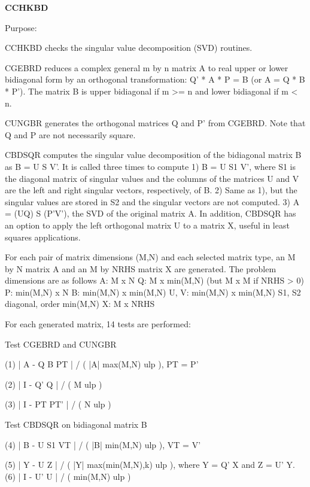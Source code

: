 {\bfseries C\+C\+H\+K\+B\+D} 

\begin{DoxyParagraph}{Purpose\+: }
\begin{DoxyVerb} CCHKBD checks the singular value decomposition (SVD) routines.

 CGEBRD reduces a complex general m by n matrix A to real upper or
 lower bidiagonal form by an orthogonal transformation: Q' * A * P = B
 (or A = Q * B * P').  The matrix B is upper bidiagonal if m >= n
 and lower bidiagonal if m < n.

 CUNGBR generates the orthogonal matrices Q and P' from CGEBRD.
 Note that Q and P are not necessarily square.

 CBDSQR computes the singular value decomposition of the bidiagonal
 matrix B as B = U S V'.  It is called three times to compute
    1)  B = U S1 V', where S1 is the diagonal matrix of singular
        values and the columns of the matrices U and V are the left
        and right singular vectors, respectively, of B.
    2)  Same as 1), but the singular values are stored in S2 and the
        singular vectors are not computed.
    3)  A = (UQ) S (P'V'), the SVD of the original matrix A.
 In addition, CBDSQR has an option to apply the left orthogonal matrix
 U to a matrix X, useful in least squares applications.

 For each pair of matrix dimensions (M,N) and each selected matrix
 type, an M by N matrix A and an M by NRHS matrix X are generated.
 The problem dimensions are as follows
    A:          M x N
    Q:          M x min(M,N) (but M x M if NRHS > 0)
    P:          min(M,N) x N
    B:          min(M,N) x min(M,N)
    U, V:       min(M,N) x min(M,N)
    S1, S2      diagonal, order min(M,N)
    X:          M x NRHS

 For each generated matrix, 14 tests are performed:

 Test CGEBRD and CUNGBR

 (1)   | A - Q B PT | / ( |A| max(M,N) ulp ), PT = P'

 (2)   | I - Q' Q | / ( M ulp )

 (3)   | I - PT PT' | / ( N ulp )

 Test CBDSQR on bidiagonal matrix B

 (4)   | B - U S1 VT | / ( |B| min(M,N) ulp ), VT = V'

 (5)   | Y - U Z | / ( |Y| max(min(M,N),k) ulp ), where Y = Q' X
                                                  and   Z = U' Y.
 (6)   | I - U' U | / ( min(M,N) ulp )


\end{DoxyVerb}
\end{DoxyParagraph}
